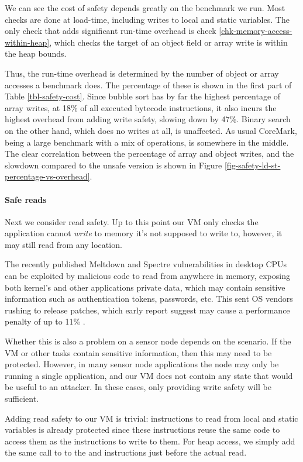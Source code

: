 We can see the cost of safety depends greatly on the benchmark we run. Most checks are done at load-time, including writes to local and static variables. The only check that adds significant run-time overhead is check \ref{chk-memory-access-within-heap}, which checks the target of an object field or array write is within the heap bounds.

Thus, the run-time overhead is determined by the number of object or array accesses a benchmark does. The percentage of these is shown in the first part of Table \ref{tbl-safety-cost}. Since bubble sort has by far the highest percentage of array writes, at 18\% of all executed bytecode instructions, it also incurs the highest overhead from adding write safety, slowing down by 47\%. Binary search on the other hand, which does no writes at all, is unaffected. As usual CoreMark, being a large benchmark with a mix of operations, is somewhere in the middle. The clear correlation between the percentage of array and object writes, and the slowdown compared to the unsafe version is shown in Figure \ref{fig-safety-ld-st-percentage-vs-overhead}.

\paragraph{Safe reads}
Next we consider read safety. Up to this point our VM only checks the application cannot \emph{write} to memory it's not supposed to write to, however, it may still read from any location.

The recently published Meltdown and Spectre vulnerabilities in desktop CPUs can be exploited by malicious code to read from anywhere in memory, exposing both kernel's and other applications private data, which may contain sensitive information such as authentication tokens, passwords, etc. This sent OS vendors rushing to release patches, which early report suggest may cause a performance penalty of up to 11\% \cite{Simakov:2018wp}.

Whether this is also a problem on a sensor node depends on the scenario. If the VM or other tasks contain sensitive information, then this may need to be protected. However, in many sensor node applications the node may only be running a single application, and our VM does not contain any state that would be useful to an attacker. In these cases, only providing write safety will be sufficient.

Adding read safety to our VM is trivial: instructions to read from local and static variables is already protected since these instructions reuse the same code to access them as the instructions to write to them. For heap access, we simply add the same call to  to the  and  instructions just before the actual read.

